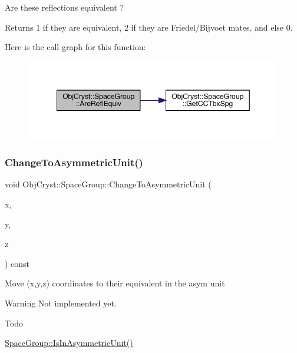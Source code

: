 Are these reflections equivalent ?

\begin{DoxyReturn}{Returns}
1 if they are equivalent, 2 if they are Friedel/\+Bijvoet mates, and else 0. 
\end{DoxyReturn}
Here is the call graph for this function\+:
\nopagebreak
\begin{figure}[H]
\begin{center}
\leavevmode
\includegraphics[width=349pt]{class_obj_cryst_1_1_space_group_a97ca9db1202aa1ff1d61458f25c8acaa_cgraph}
\end{center}
\end{figure}
\mbox{\label{class_obj_cryst_1_1_space_group_a11651737de9e6ba328fffacce8a46b5a}} 
\subsubsection{\texorpdfstring{ChangeToAsymmetricUnit()}{ChangeToAsymmetricUnit()}}
{\footnotesize\ttfamily void Obj\+Cryst\+::\+Space\+Group\+::\+Change\+To\+Asymmetric\+Unit (\begin{DoxyParamCaption}\item[{R\+E\+AL}]{x,  }\item[{R\+E\+AL}]{y,  }\item[{R\+E\+AL}]{z }\end{DoxyParamCaption}) const}

Move (x,y,z) coordinates to their equivalent in the asym unit \begin{DoxyWarning}{Warning}
Not implemented yet. 
\end{DoxyWarning}
\begin{DoxyRefDesc}{Todo}
\item[\mbox{\hyperlink{todo__todo000014}{Todo}}]\mbox{\hyperlink{class_obj_cryst_1_1_space_group_ad69342f0b97ad491c7aa5cb5061e9261}{Space\+Group\+::\+Is\+In\+Asymmetric\+Unit()}} \end{DoxyRefDesc}
\mbox{\label{class_obj_cryst_1_1_space_group_aee36e98c4a5044b14429dd8f7d98c2f3}} 
